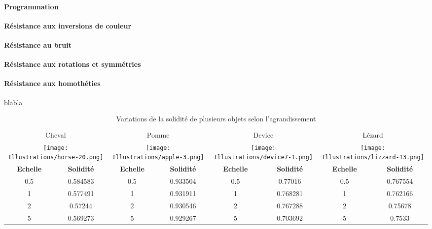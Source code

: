 \documentclass{article}
\begin{document}
	\paragraph{Programmation}
	
	\paragraph{Résistance aux inversions de couleur}
	
	\paragraph{Résistance au bruit}
	
	\paragraph{Résistance aux rotations et symmétries}
      
	\paragraph{Résistance aux homothéties} blabla \\
	
	  \begin{table}
	  \centering
	  \begin{tabular}{|c|c|c|c|c|c|c|c|}
	    \hline
	    \multicolumn{2}{|c|}{Cheval} & \multicolumn{2}{|c|}{Pomme} & \multicolumn{2}{|c|}{Device} & \multicolumn{2}{|c|}{Lézard} \\
	    \multicolumn{2}{|c|}{\texttt{[image: Illustrations/horse-20.png]}} 
	    & \multicolumn{2}{|c|}{\texttt{[image: Illustrations/apple-3.png]}} 
	    & \multicolumn{2}{|c|}{\texttt{[image: Illustrations/device7-1.png]}} 
	    & \multicolumn{2}{|c|}{\texttt{[image: Illustrations/lizzard-13.png]}} \\
	    \hline
	    \textbf{Echelle} & \textbf{Solidité} & \textbf{Echelle} & \textbf{Solidité} & \textbf{Echelle} & \textbf{Solidité} & \textbf{Echelle} & \textbf{Solidité} \\
	    \hline
	    0.5 & 0.584583 & 0.5 & 0.933504 & 0.5 & 0.77016 & 0.5 & 0.767554 \\
	    \hline
	    1 & 0.577491 & 1 & 0.931911 & 1 & 0.768281 & 1 & 0.762166 \\
	    \hline
	    2 & 0.57244 & 2 & 0.930546 & 2 & 0.767288 & 2 & 0.75678 \\
	    \hline
	    5 & 0.569273 & 5 & 0.929267 & 5 & 0.703692 & 5 & 0.7533 \\
	    \hline
	  \end{tabular}
	  \caption{Variations de la solidité de plusieurs objets selon l'agrandissement}
	  \label{solidité-scaling-table}
	  \end{table}
	  
\end{document}
